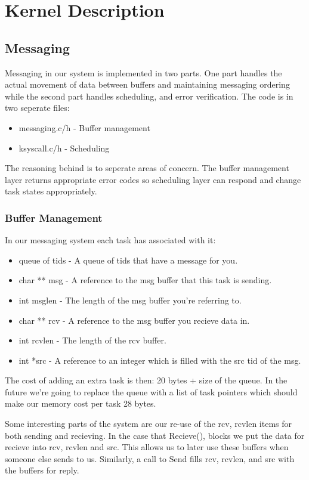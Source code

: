 \documentclass{article}
\begin{document}
\section{Kernel Description}

\subsection{Messaging}

Messaging in our system is implemented in two parts. One part handles the actual movement of data between buffers and maintaining messaging ordering while the second part handles scheduling, and error verification. The code is in two seperate files:
\begin{itemize}
    \item messaging.{c/h} - Buffer management
    \item ksyscall.{c/h} - Scheduling
\end{itemize}
The reasoning behind is to seperate areas of concern. The buffer management layer returns appropriate error codes so scheduling layer can respond and change task states appropriately.

\subsubsection{Buffer Management}

In our messaging system each task has associated with it:
\begin{itemize}
    \item queue of tids - A queue of tids that have a message for you.
    \item char ** msg - A reference to the msg buffer that this task is sending.
    \item int msglen - The length of the msg buffer you're referring to.
    \item char ** rcv - A reference to the msg buffer you recieve data in.
    \item int rcvlen - The length of the rcv buffer.
    \item int *src - A reference to an integer which is filled with the src tid of the msg.
\end{itemize}

The cost of adding an extra task is then: 20 bytes + size of the queue. In the future we're going to replace the queue with a list of task pointers which should make our memory cost per task 28 bytes.

Some interesting parts of the system are our re-use of the rcv, rcvlen items for both sending and recieving. In the case that Recieve(), blocks we put the data for recieve into rcv, rcvlen and src. This allows us to later use these buffers when someone else sends to us. Similarly, a call to Send fills rcv, rcvlen, and src with the buffers for reply.
\end{document}
